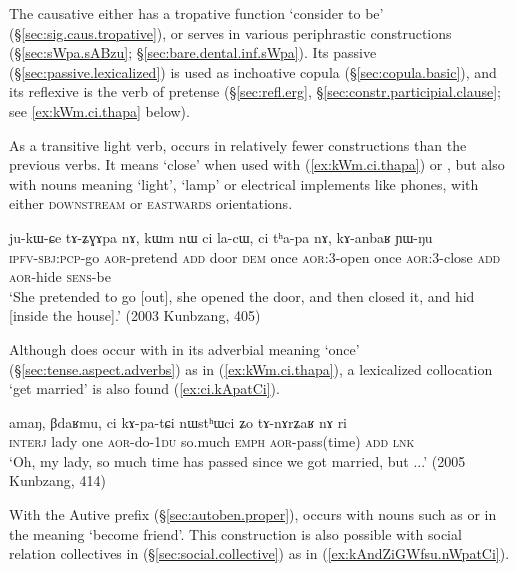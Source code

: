 The causative  either has a tropative function `consider to be' (§\ref{sec:sig.caus.tropative}), or serves in various periphrastic constructions (§\ref{sec:sWpa.sABzu}; §\ref{sec:bare.dental.inf.sWpa}). Its passive  (§\ref{sec:passive.lexicalized}) is used as inchoative copula (§\ref{sec:copula.basic}), and its reflexive is the verb of pretense  (§\ref{sec:refl.erg}, §\ref{sec:constr.participial.clause}; see \ref{ex:kWm.ci.thapa} below).

As a transitive light verb,  occurs in relatively fewer constructions than the previous verbs. It means `close' when used with  (\ref{ex:kWm.ci.thapa}) or , but also with nouns meaning `light', `lamp' or electrical implements like phones, with either \textsc{downstream} or \textsc{eastwards} orientations.

\begin{exe}
\ex \label{ex:kWm.ci.thapa}
\gll ju-kɯ-ɕe tɤ-ʑɣɤpa nɤ, kɯm nɯ ci la-cɯ, ci tʰa-pa nɤ, kɤ-anbaʁ ɲɯ-ŋu \\
\textsc{ipfv}-\textsc{sbj}:\textsc{pcp}-go \textsc{aor}-pretend \textsc{add} door \textsc{dem} once \textsc{aor}:3\flobv{}-open once \textsc{aor}:3\flobv{}-close \textsc{add} \textsc{aor}-hide \textsc{sens}-be \\
\glt `She pretended to go [out], she opened the door, and then closed it, and hid [inside the house].' (2003 Kunbzang, 405)
\end{exe}

Although  does occur with  in its adverbial meaning `once' (§\ref{sec:tense.aspect.adverbs}) as in (\ref{ex:kWm.ci.thapa}), a lexicalized collocation  `get married' is also found (\ref{ex:ci.kApatCi}).

\begin{exe}
\ex \label{ex:ci.kApatCi}
\gll amaŋ, βdaʁmu, ci kɤ-pa-tɕi nɯstʰɯci ʑo tɤ-nɤrʑaʁ nɤ ri \\
\textsc{interj} lady one \textsc{aor}-do-\textsc{1du} so.much \textsc{emph} \textsc{aor}-pass(time) \textsc{add} \textsc{lnk} \\
\glt `Oh, my lady, so much time has passed since we got married, but ...' (2005 Kunbzang, 414)
\end{exe}

With the Autive prefix (§\ref{sec:autoben.proper}),  occurs with nouns such as  or  in the meaning `become friend'. This construction is also possible with social relation collectives in  (§\ref{sec:social.collective}) as in (\ref{ex:kAndZiGWfsu.nWpatCi}).

